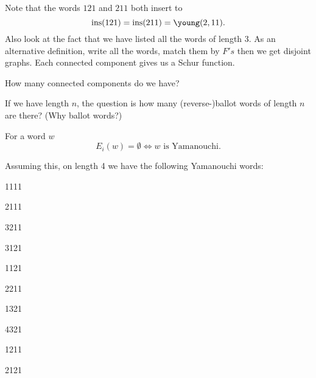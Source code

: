 \documentclass[12pt]{memoir}
\DeclareMathOperator{\ins}{ins}
\begin{document}
\begin{Ex}
\begin{center}

    \end{center}

    Note that the words $121$ and $211$ both insert to 
    $$\ins(121)=\ins(211)=\young(2,11).$$
    Also look at the fact that we have listed all the words of length $3$. As an alternative definition, write all the words, match them by $F's$ then we get disjoint graphs. Each connected component gives us a Schur function.
\end{Ex}

\begin{significant}
How many connected components do we have?
\end{significant}

If we have length $n$, the question is how many (reverse-)ballot words of length $n$ are there? (Why ballot words?)

\begin{Lem}[Homework]
    For a word $w$ 
    $$E_i(w)=\emptyset\iff w\text{ is Yamanouchi.}$$
\end{Lem}

Assuming this, on length 4 we have the following Yamanouchi words: 
\begin{enumerate}
\begin{multicols}{3}
    \item 1111
    \item 2111
    \item 3211
    \item 3121
    \item 1121
    \item 2211
    \item 1321
    \item 4321
    \item 1211
    \item 2121
\end{multicols}
\end{enumerate}
\end{document}
